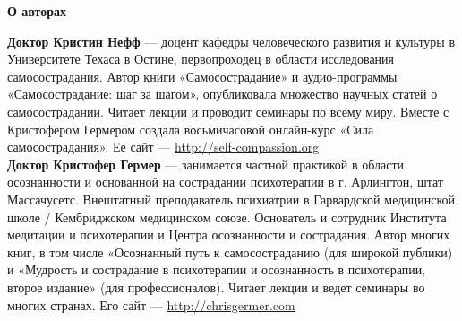 
{\bf \Huge О авторах\\[2cm]}

{\bf Доктор Кристин Нефф} --- доцент кафедры человеческого развития и культуры в Университете Техаса в Остине, первопроходец в области исследования самосострадания. Автор книги «Самосострадание» и аудио-программы «Самосострадание: шаг за шагом», опубликовала множество научных статей о самосострадании. Читает лекции и проводит семинары по всему миру. Вместе с Кристофером Гермером создала восьмичасовой онлайн-курс «Сила самосострадания». Ее сайт --- \url{http://self-compassion.org}\\[1mm]
	
{\bf Доктор Кристофер Гермер} --- занимается частной практикой в области осознанности и основанной на сострадании психотерапии в г. Арлингтон, штат Массачусетс. Внештатный преподаватель психиатрии в Гарвардской медицинской школе / Кембриджском медицинском союзе. Основатель и сотрудник Института медитации и психотерапии и Центра осознанности и сострадания. Автор многих книг, в том числе «Осознанный путь к самосостраданию (для широкой публики) и «Мудрость и сострадание в психотерапии и осознанность в психотерапии, второе издание» (для профессионалов). Читает лекции и ведет семинары во многих странах. Его сайт --- \url{http://chrisgermer.com}
	